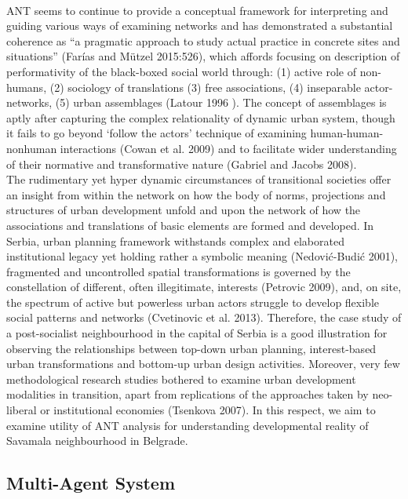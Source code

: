 \documentclass[11pt]{report}
\begin{document}
\\
ANT seems to continue to provide a conceptual framework for interpreting and guiding various ways of examining networks and has demonstrated a substantial coherence as “a pragmatic approach to study actual practice in concrete sites and situations” (Farías and Mützel 2015:526), which affords focusing on description of performativity of the black-boxed social world through: (1) active role of non-humans, (2) sociology of translations (3) free associations, (4) inseparable actor-networks, (5) urban assemblages (Latour 1996 ). The concept of assemblages is aptly after capturing the complex relationality of dynamic urban system, though it fails to go beyond ‘follow the actors’ technique of examining human-human-nonhuman interactions (Cowan et al. 2009) and to facilitate wider understanding of their normative and transformative nature (Gabriel and Jacobs 2008).
\\
The rudimentary yet hyper dynamic circumstances of transitional societies offer an insight from within the network on how the body of norms, projections and structures of urban development unfold and upon the network of how the associations and translations of basic elements are formed and developed. In Serbia, urban planning framework withstands complex and elaborated institutional legacy yet holding rather a symbolic meaning (Nedović-Budić 2001), fragmented and uncontrolled spatial transformations is governed by the constellation of different, often illegitimate, interests (Petrovic 2009), and, on site, the spectrum of active but powerless urban actors struggle to develop flexible social patterns and networks (Cvetinovic et al. 2013). Therefore, the case study of a post-socialist neighbourhood in the capital of Serbia is a good illustration for observing the relationships between top-down urban planning, interest-based urban transformations and bottom-up urban design activities. Moreover, very few methodological research studies bothered to examine urban  development modalities  in  transition,  apart  from  replications  of  the  approaches  taken  by  neo-liberal  or institutional economies (Tsenkova 2007). In this respect, we aim to examine utility of ANT analysis for understanding developmental reality of Savamala neighbourhood in Belgrade.

\subsection{Multi-Agent System}
\end{document}
